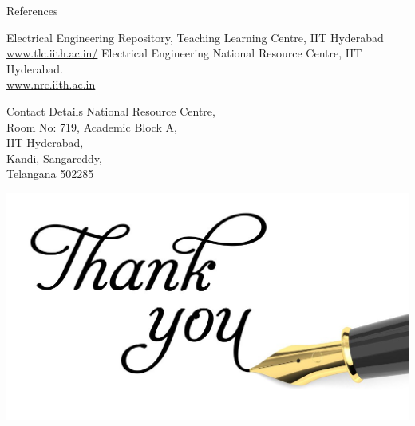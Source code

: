 \documentclass{beamer}
\begin{document}
\begin{frame}{References}
\begin{thebibliography}{00}
 Electrical Engineering Repository, Teaching Learning Centre, IIT Hyderabad \\ \url{www.tlc.iith.ac.in/}
 Electrical Engineering National Resource Centre, IIT Hyderabad. \\ \url{www.nrc.iith.ac.in}

\end{thebibliography}
\end{frame}



\begin{frame}{Contact Details}
\vspace{1cm}
National Resource Centre,\\
Room No: 719, Academic Block A,\\
IIT Hyderabad,\\
Kandi, Sangareddy,\\
Telangana 502285
\vspace{0.5in}
\vfill
\begin{flushright}
\includegraphics[scale=0.7]{GIMG/thank.jpg}
\end{flushright}
\end{frame}
\end{document}
